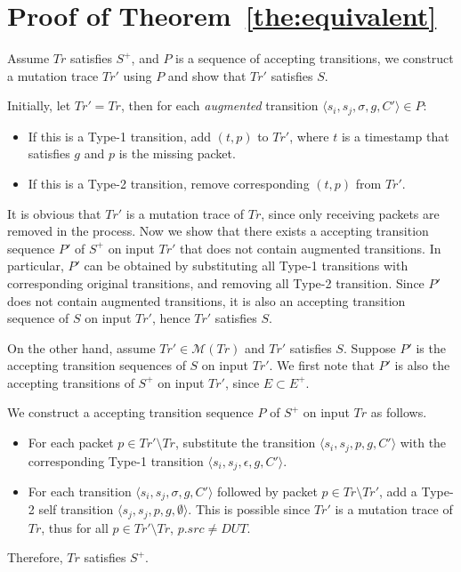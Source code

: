 \appendix
\section{Proof of Theorem~\ref{the:equivalent}}
Assume $Tr$ satisfies $S^+$, and $P$ is a sequence of accepting transitions,
we construct a mutation trace $Tr'$ using $P$ and show that $Tr'$ satisfies
$S$.

Initially, let $Tr'=Tr$, then for each \textit{augmented} transition $\langle s_i,
s_j, \sigma, g, C'\rangle \in P$:
\begin{itemize}
  \item If this is a Type-1 transition, add $(t, p)$ to $Tr'$, where $t$ is a
    timestamp that satisfies $g$ and $p$ is the missing packet.
  \item If this is a Type-2 transition, remove corresponding $(t, p)$ from
    $Tr'$.
\end{itemize}
It is obvious that $Tr'$ is a mutation trace of $Tr$, since only receiving
packets are removed in the process.
%
Now we show that there exists a accepting
transition sequence $P'$ of $S^+$ on input $Tr'$ that does not contain
augmented transitions.
%
In particular, $P'$ can be obtained by substituting all
Type-1 transitions with corresponding original transitions, and removing all
Type-2 transition.
%
Since $P'$ does not contain augmented transitions, it is also an accepting
transition sequence of $S$ on input $Tr'$, hence $Tr'$ satisfies $S$.

On the other hand, assume $Tr' \in \mathcal{M}(Tr)$ and $Tr'$ satisfies $S$.
Suppose $P'$ is the accepting transition sequences of $S$ on input $Tr'$.
%
We first note that $P'$ is also the accepting transitions of $S^+$ on input
$Tr'$, since $E \subset E^+$.

We construct a accepting transition sequence $P$ of $S^+$ on input $Tr$ as
follows.
\begin{itemize}
  \item For each packet $p \in Tr' \setminus Tr$, substitute the transition
    $\langle s_i, s_j, p, g, C'\rangle$ with the corresponding Type-1
    transition $\langle s_i, s_j, \epsilon, g, C'\rangle$.
  \item For each transition $\langle s_i, s_j, \sigma, g, C'\rangle$
    followed by packet $p \in Tr\setminus Tr'$, add a Type-2 self
    transition $\langle s_j, s_j, p, g, \emptyset\rangle$. This is
    possible since $Tr'$ is a mutation trace of $Tr$, thus  for all $p \in Tr'
    \setminus Tr$, $p.src \ne DUT$.
\end{itemize}
Therefore, $Tr$ satisfies $S^+$.

